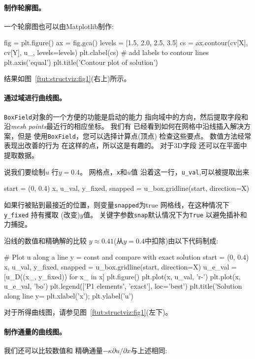 \paragraph{制作轮廓图。}
一个轮廓图也可以由Matplotlib制作:

\begin{python}
fig = plt.figure()
ax = fig.gca()
levels = [1.5, 2.0, 2.5, 3.5]
cs = ax.contour(cv[X], cv[Y], u_, levels=levels)
plt.clabel(cs)  # add labels to contour lines
plt.axis('equal')
plt.title('Contour plot of solution')
\end{python}
结果如图~\ref{ftut:structviz:fig1}(右上)所示。

\paragraph{通过域进行曲线图。}
\texttt{BoxField}对象的一个方便的功能是启动的能力
指向域中的方向，然后提取字段和
沿\emph{mesh points}最近行的相应坐标。 我们有
已经看到如何在网格中沿线插入解决方案，但是
使用\texttt{BoxField}，您可以选择计算点(顶点)
检查这些要点。 数值方法经常表现出改善的行为
在这样的点，所以这是有趣的。 对于3D字段
还可以在平面中提取数据。

说我们要绘制$u$
行$y=0.4$。 网格点，\texttt{x}和$ u $值
沿着这一行，\verb!u_val!,可以被提取出来


\begin{python}
start = (0, 0.4)
x, u_val, y_fixed, snapped = u_box.gridline(start, direction=X)
\end{python}
如果行被贴到最接近的位置，则变量\texttt{snapped}为true
网格线，在这种情况下\verb!y_fixed! 持有攫取
(改变)$y$值。 关键字参数\texttt{snap}默认情况下为\texttt{True}
以避免插补和力捕捉。

沿线的数值和精确解的比较
$y\approx 0.41$(从$y=0.4$中扣除)由以下代码制成:

\begin{python}
    # Plot u along a line y = const and compare with exact solution
    start = (0, 0.4)
    x, u_val, y_fixed, snapped = u_box.gridline(start, direction=X)
    u_e_val = [u_D((x_, y_fixed)) for x_ in x]
    plt.figure()
    plt.plot(x, u_val, 'r-')
    plt.plot(x, u_e_val, 'bo')
    plt.legend(['P1 elements', 'exact'], loc='best')
    plt.title('Solution along line y=%
    plt.xlabel('x');  plt.ylabel('u')
\end{python}
对于所得曲线图，请参见图~\ref{ftut:structviz:fig1}(左下)。

\paragraph{制作通量的曲线图。}
我们还可以比较数值和
精确通量$-\kappa\partial u/\partial x$与上述相同:

